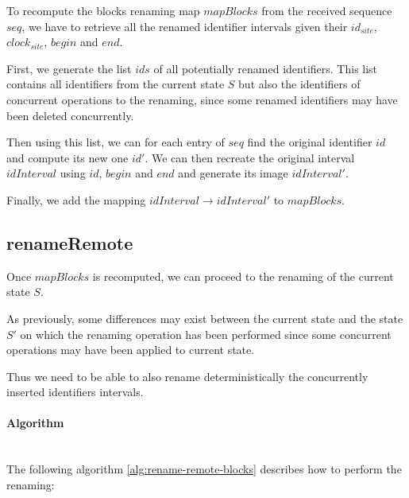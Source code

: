 \documentclass[a4paper]{article}
\begin{document}
To recompute the blocks renaming map $mapBlocks$ from the received sequence $seq$,
we have to retrieve all the renamed identifier intervals given their $id_{site}$,
$clock_{site}$, $begin$ and $end$.

First, we generate the list $ids$ of all potentially renamed identifiers.
This list contains all identifiers from the current state $S$ but also the identifiers
of concurrent operations to the renaming, since some renamed identifiers may have
been deleted concurrently.

Then using this list, we can for each entry of $seq$ find the original identifier
$id$ and compute its new one $id'$.
We can then recreate the original interval $idInterval$ using $id$, $begin$ and $end$
and generate its image $idInterval'$.

Finally, we add the mapping $idInterval \to idInterval'$ to $mapBlocks$.

\subsection{renameRemote}

Once $mapBlocks$ is recomputed, we can proceed to the renaming of the current
state $S$.

As previously, some differences may exist between the current state and the state $S'$
on which the renaming operation has been performed since some concurrent operations
may have been applied to current state.

Thus we need to be able to also rename deterministically the concurrently
inserted identifiers intervals.

\paragraph{Algorithm}~\\

The following algorithm \ref{alg:rename-remote-blocks} describes how
to perform the renaming:
\end{document}
